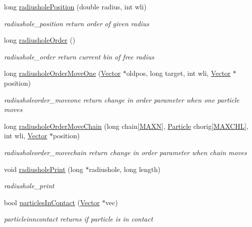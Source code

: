 \begin{DoxyCompactItemize}
long \hyperlink{class_move_creator_a7e7a64b06671d93d2f3dcf4cac2907b9}{radiushole\+Position} (double radius, int wli)
\begin{DoxyCompactList}\small\item\em radiushole\+\_\+position return order of given radius \end{DoxyCompactList}\item 
long \hyperlink{class_move_creator_acaaaac79b83b3898633b2aa279d5591c}{radiushole\+Order} ()
\begin{DoxyCompactList}\small\item\em radiushole\+\_\+order return current bin of free radius \end{DoxyCompactList}\item 
long \hyperlink{class_move_creator_a7298044915a0294b05b7fc61b1fd84ff}{radiushole\+Order\+Move\+One} (\hyperlink{class_vector}{Vector} $\ast$oldpos, long target, int wli, \hyperlink{class_vector}{Vector} $\ast$position)
\begin{DoxyCompactList}\small\item\em radiusholeorder\+\_\+moveone return change in order parameter when one particle moves \end{DoxyCompactList}\item 
long \hyperlink{class_move_creator_ada2d830480575861db26453a818c4441}{radiushole\+Order\+Move\+Chain} (long chain\mbox{[}\hyperlink{macros_8h_ad1f79d9d99776d7353c6659c307c83c6}{M\+A\+X\+N}\mbox{]}, \hyperlink{class_particle}{Particle} chorig\mbox{[}\hyperlink{macros_8h_a6ba68031db49c489a6a5902f87b915c8}{M\+A\+X\+C\+H\+L}\mbox{]}, int wli, \hyperlink{class_vector}{Vector} $\ast$position)
\begin{DoxyCompactList}\small\item\em radiusholeorder\+\_\+movechain return change in order parameter when chain moves \end{DoxyCompactList}\item 
void \hyperlink{class_move_creator_aea9e2c6f70e704726a01f5a7265271f0}{radiushole\+Print} (long $\ast$radiushole, long length)
\begin{DoxyCompactList}\small\item\em radiushole\+\_\+print \end{DoxyCompactList}\item 
bool \hyperlink{class_move_creator_aae176167187714ee8c7d99cc800be011}{particles\+In\+Contact} (\hyperlink{class_vector}{Vector} $\ast$vec)
\begin{DoxyCompactList}\small\item\em particleinncontact returns if particle is in contact \end{DoxyCompactList}\item 

\end{DoxyCompactItemize}
